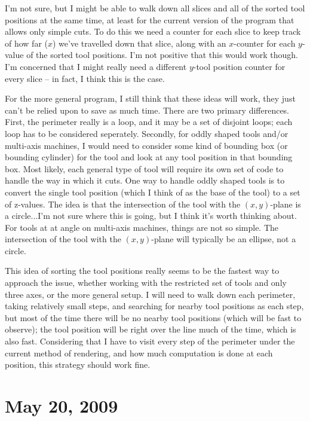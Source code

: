 \documentclass[titlepage,oneside,10pt]{article}
\begin{document}
I'm not sure, but I might be able to walk down all slices and all of
the sorted tool positions at the same time, at least for the current
version of the program that allows only simple cuts. To do this we
need a counter for each slice to keep track of how far ($x$) we've
travelled down that slice, along with an $x$-counter for each
$y$-value of the sorted tool positions. I'm not positive that this
would work though. I'm concerned that I might really need a different
$y$-tool position counter for every slice -- in fact, I think this is
the case.

For the more general program, I still think that these ideas will work,
they just can't be relied upon to save as much time. There are two
primary differences. First, the perimeter really is a loop, and it may
be a set of disjoint loops; each loop has to be considered
seperately. Secondly, for oddly shaped tools and/or multi-axis
machines, I would need to consider some kind of bounding box (or
bounding cylinder) for the tool and look at any tool position in that
bounding box. Most likely, each general type of tool will require its
own set of code to handle the way in which it cuts. One way to handle
oddly shaped tools is to convert the single tool position (which I
think of as the base of the tool) to a set of z-values. The idea is
that the intersection of the tool with the $(x,y)$-plane is a
circle...I'm not sure where this is going, but I think it's worth
thinking about. For tools at at angle on multi-axis machines, things
are not so simple. The intersection of the tool with the $(x,y)$-plane
will typically be an ellipse, not a circle.

This idea of sorting the tool positions really seems to be the fastest
way to approach the issue, whether working with the restricted set of
tools and only three axes, or the more general setup. I will need to
walk down each perimeter, taking relatively small steps, and searching
for nearby tool positions as each step, but most of the time there
will be no nearby tool positions (which will be fast to observe);
the tool position will be right over the line much of the time, which
is also fast. Considering that I have to visit every step of the
perimeter under the current method of rendering, and how much
computation is done at each position, this strategy should work
fine.

\section{May 20, 2009}
\end{document}
